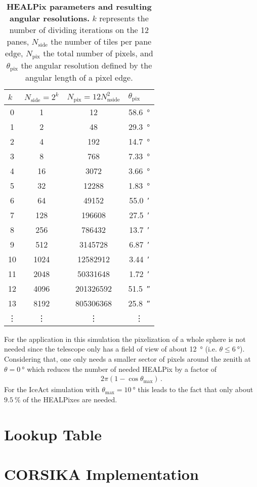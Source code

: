 \begin{table}[H]
\centering
\begin{tabular}{S[table-format=2.0]|S[table-format=4.0]|S[table-format=9.0]|S[table-format=2.2]}
 &  &  &  \\
  & 1    & 12        &  \SI{58.6}{\degree}\\
1  & 2    & 48        &  \SI{29.3}{\degree}\\
2  & 4    & 192       &  \SI{14.7}{\degree}\\
3  & 8    & 768 	  &  \SI{7.33}{\degree}\\
4  & 16   & 3072      &  \SI{3.66}{\degree}\\
5  & 32   & 12288     &  \SI{1.83}{\degree}\\
6  & 64   & 49152     &  \SI{55.0}{\arcminute}\\
7  & 128  & 196608    &  \SI{27.5}{\arcminute}\\
8  & 256  & 786432    &  \SI{13.7}{\arcminute}\\
9  & 512  & 3145728   &  \SI{6.87}{\arcminute}\\
10 & 1024 & 12582912  &  \SI{3.44}{\arcminute}\\
11 & 2048 & 50331648  &  \SI{1.72}{\arcminute}\\
12 & 4096 & 201326592 &  \SI{51.5}{\arcsecond}\\
13 & 8192 & 805306368 &  \SI{25.8}{\arcsecond}\\
 &  &  &  \\
\end{tabular}
\caption[HEALPix parameters and resulting angular resolutions]{\textbf{HEALPix parameters and resulting angular resolutions.} $k$ represents the number of dividing iterations on the 12 panes, $N_\text{side}$ the number of tiles per pane edge, $N_\text{pix}$ the total number of pixels, and $\theta_\text{pix}$ the angular resolution defined by the angular length of a pixel edge. \cite{healpix:paper}}
\end{table}

For the application in this simulation the pixelization of a whole sphere is not needed since the telescope only has a field of view of about \SI{12}{\degree} (i.e. $\theta \leq \SI{6}{\degree}$). Considering that, one only needs a smaller sector of pixels around the zenith at $\theta = \SI{0}{\degree}$ which reduces the number of needed HEALPix by a factor of
\begin{align}
	2\pi\left(1-\cos\theta_\text{max}\right)\,.
\end{align}
For the IceAct simulation with $\theta_\text{max} = \SI{10}{\degree}$ this leads to the fact that only about $\SI{9.5}{\percent}$ of the HEALPixes are needed.

\section{Lookup Table}

\section{CORSIKA Implementation}
